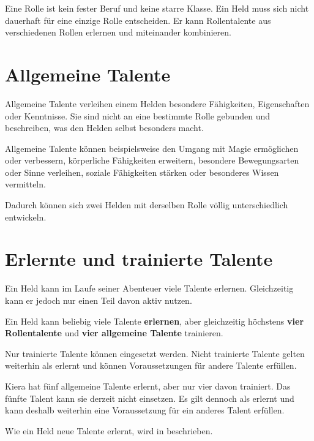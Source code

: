 Eine Rolle ist kein fester Beruf und keine starre Klasse. Ein Held muss sich nicht dauerhaft für eine einzige Rolle entscheiden. Er kann Rollentalente aus verschiedenen Rollen erlernen und miteinander kombinieren.

\section{Allgemeine Talente}

Allgemeine Talente verleihen einem Helden besondere Fähigkeiten, Eigenschaften oder Kenntnisse. Sie sind nicht an eine bestimmte Rolle gebunden und beschreiben, was den Helden selbst besonders macht.

Allgemeine Talente können beispielsweise den Umgang mit Magie ermöglichen oder verbessern, körperliche Fähigkeiten erweitern, besondere Bewegungsarten oder Sinne verleihen, soziale Fähigkeiten stärken oder besonderes Wissen vermitteln.

Dadurch können sich zwei Helden mit derselben Rolle völlig unterschiedlich entwickeln.

\section{Erlernte und trainierte Talente}

Ein Held kann im Laufe seiner Abenteuer viele Talente erlernen. Gleichzeitig kann er jedoch nur einen Teil davon aktiv nutzen.

\begin{kurzregel}[title=Erlernte und trainierte Talente]
Ein Held kann beliebig viele Talente \textbf{erlernen}, aber gleichzeitig höchstens \textbf{vier Rollentalente} und \textbf{vier allgemeine Talente} trainieren.

Nur trainierte Talente können eingesetzt werden. Nicht trainierte Talente gelten weiterhin als erlernt und können Voraussetzungen für andere Talente erfüllen.
\end{kurzregel}

\begin{beispiel}[title=Beispiel: Ein untrainiertes Talent]
Kiera hat fünf allgemeine Talente erlernt, aber nur vier davon trainiert. Das fünfte Talent kann sie derzeit nicht einsetzen. Es gilt dennoch als erlernt und kann deshalb weiterhin eine Voraussetzung für ein anderes Talent erfüllen.
\end{beispiel}

Wie ein Held neue Talente erlernt, wird in  beschrieben.

